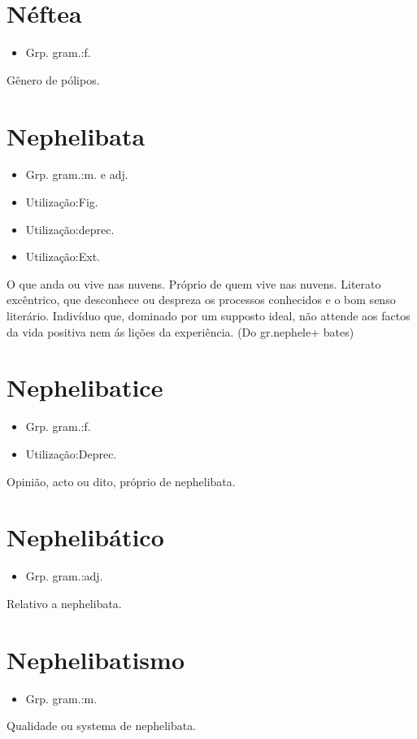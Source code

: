 \section{Néftea}
\begin{itemize}
\item {Grp. gram.:f.}
\end{itemize}
Gênero de pólipos.
\section{Nephelibata}
\begin{itemize}
\item {Grp. gram.:m.  e  adj.}
\end{itemize}
\begin{itemize}
\item {Utilização:Fig.}
\end{itemize}
\begin{itemize}
\item {Utilização:deprec.}
\end{itemize}
\begin{itemize}
\item {Utilização:Ext.}
\end{itemize}
O que anda ou vive nas nuvens.
Próprio de quem vive nas nuvens.
Literato excêntrico, que desconhece ou despreza os processos conhecidos e o bom senso literário.
Indivíduo que, dominado por um supposto ideal, não attende aos factos da vida positiva nem ás lições da experiência.
(Do gr.\textunderscore  nephele\textunderscore  + \textunderscore bates\textunderscore )
\section{Nephelibatice}
\begin{itemize}
\item {Grp. gram.:f.}
\end{itemize}
\begin{itemize}
\item {Utilização:Deprec.}
\end{itemize}
Opinião, acto ou dito, próprio de nephelibata.
\section{Nephelibático}
\begin{itemize}
\item {Grp. gram.:adj.}
\end{itemize}
Relativo a nephelibata.
\section{Nephelibatismo}
\begin{itemize}
\item {Grp. gram.:m.}
\end{itemize}
Qualidade ou systema de nephelibata.
